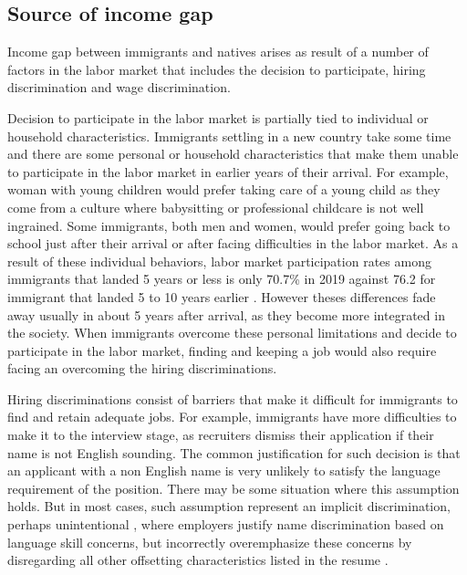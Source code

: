 \subsection{Source of income gap}

Income gap between immigrants and natives arises as result of a number of factors in the labor market that includes the decision to participate, hiring discrimination and wage discrimination.

\vspace{0.7em}\par
Decision to participate in the labor market is partially tied to individual or household characteristics.
Immigrants settling in a new country take some time and there are some personal or household characteristics that make them unable to participate in the labor market in earlier years of their arrival.
For example, woman with young children would prefer taking care of a young child as they come from a culture where babysitting or professional childcare is not well ingrained.
Some immigrants, both men and women, would prefer going back to school just after their arrival or after facing difficulties in the labor market.
As a result of these individual behaviors, labor market participation rates among immigrants that landed 5 years or less is only 70.7\% in 2019 against 76.2 for immigrant that landed 5 to 10 years earlier \citep{statCan:002}.
However theses differences fade away usually in about 5 years after arrival, as they become more integrated in the society.
When immigrants overcome these personal limitations and decide to participate in the labor market, finding and keeping a job would also require facing an overcoming the hiring discriminations.

\vspace{0.7em}\par
Hiring discriminations consist of barriers that make it difficult for immigrants to find and retain adequate jobs.
For example, immigrants have more difficulties to make it to the interview stage, as recruiters dismiss their application if their name is not English sounding.
The common justification for such decision is that an applicant with a non English name is very unlikely to satisfy the language requirement of the position.
There may be some situation where this assumption holds.
But in most cases, such assumption represent an implicit discrimination, perhaps unintentional \citep{Crandall:wo,ROOTH2010523}, where employers justify name discrimination based on language skill concerns, but incorrectly overemphasize these concerns by disregarding all other offsetting characteristics listed in the resume \citep{Oreopoulos:2011jv}.

